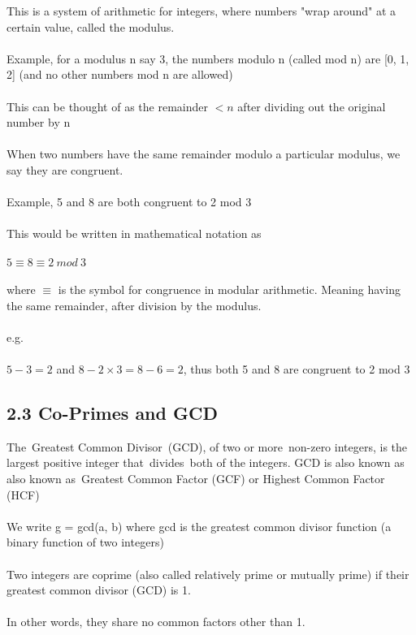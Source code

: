 \documentclass[11pt]{article}   	%
\begin{document}
This is a system of arithmetic for integers, where numbers "wrap around" at a certain value, called the modulus. \\
\\
Example, for a modulus n say 3, the numbers modulo n (called mod n) are [0, 1, 2] (and no other numbers mod n are allowed) \\
\\
This can be thought of as the remainder $ < n $ after dividing out the original number by n \\
\\
When two numbers have the same remainder modulo a particular modulus, we say they are congruent. \\
\\
Example, 5 and 8 are both congruent to 2 mod 3 \\
\\
This would be written in mathematical notation as \\
\\
$ 5 \equiv 8 \equiv 2 \ mod \ 3 $ \\
\\
where $ \equiv $ is the symbol for congruence in modular arithmetic. Meaning having the same remainder, after division by the modulus. \\
\\
e.g. \\
\\
$ 5 - 3 = 2 $ and $ 8 - 2 \times 3 = 8 - 6 = 2 $, thus both 5 and 8 are congruent to 2 mod 3 \\


\subsection*{2.3 Co-Primes and GCD}

The Greatest Common Divisor (GCD), of two or more non-zero integers, is the largest positive integer that divides both of the integers. GCD is also known as also known as Greatest Common Factor (GCF) or Highest Common Factor (HCF) \\
\\
We write g = gcd(a, b) where gcd is the greatest common divisor function (a binary function of two integers) \\
\\
Two integers are coprime (also called relatively prime or mutually prime) if their greatest common divisor (GCD) is 1. \\
\\
In other words, they share no common factors other than 1.
\end{document}
